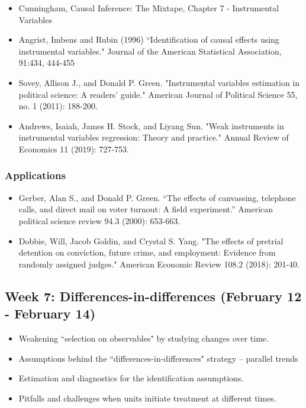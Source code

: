 \documentclass[11pt, article, oneside]{memoir}
\theoremstyle{Assumption}
\begin{document}
\begin{itemize}
\item Cunningham, Causal Inference: The Mixtape, Chapter 7 - Instrumental Variables
\item Angrist, Imbens and Rubin (1996) ``Identification of causal effects using instrumental variables." Journal of the American Statistical Association, 91:434, 444-455
\item Sovey, Allison J., and Donald P. Green. "Instrumental variables estimation in political science: A readers’ guide." American Journal of Political Science 55, no. 1 (2011): 188-200.
\item Andrews, Isaiah, James H. Stock, and Liyang Sun. "Weak instruments in instrumental variables regression: Theory and practice." Annual Review of Economics 11 (2019): 727-753.
\end{itemize}

\subsubsection{Applications}

\begin{itemize}
\item Gerber, Alan S., and Donald P. Green. “The effects of canvassing, telephone calls,
and direct mail on voter turnout: A field experiment.” American political science
review 94.3 (2000): 653-663.
\item Dobbie, Will, Jacob Goldin, and Crystal S. Yang. "The effects of pretrial detention on conviction, future crime, and employment: Evidence from randomly assigned judges." American Economic Review 108.2 (2018): 201-40.
\end{itemize}


\subsection{Week 7: Differences-in-differences (February 12 - February 14)}

\begin{itemize}
\item Weakening ``selection on observables" by studying changes over time. 
\item Assumptions behind the ``differences-in-differences" strategy -- parallel trends
\item Estimation and diagnostics for the identification assumptions.
\item Pitfalls and challenges when units initiate treatment at different times. 
\end{itemize}
\end{document}
